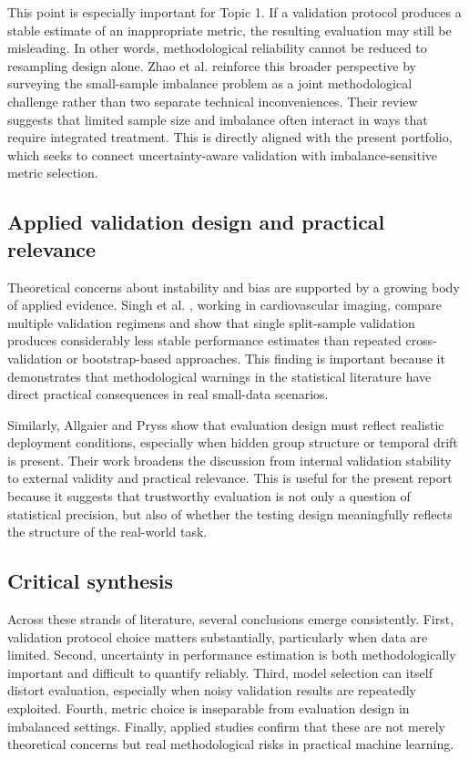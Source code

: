 \documentclass[11pt,a4paper]{article}
\begin{document}
This point is especially important for Topic 1. If a validation protocol produces a stable estimate of an inappropriate metric, the resulting evaluation may still be misleading. In other words, methodological reliability cannot be reduced to resampling design alone. Zhao et al. \cite{zhao2025smallsampleimbalance} reinforce this broader perspective by surveying the small-sample imbalance problem as a joint methodological challenge rather than two separate technical inconveniences. Their review suggests that limited sample size and imbalance often interact in ways that require integrated treatment. This is directly aligned with the present portfolio, which seeks to connect uncertainty-aware validation with imbalance-sensitive metric selection.

\subsection{Applied validation design and practical relevance}

Theoretical concerns about instability and bias are supported by a growing body of applied evidence. Singh et al. \cite{singh2021impact}, working in cardiovascular imaging, compare multiple validation regimens and show that single split-sample validation produces considerably less stable performance estimates than repeated cross-validation or bootstrap-based approaches. This finding is important because it demonstrates that methodological warnings in the statistical literature have direct practical consequences in real small-data scenarios.

Similarly, Allgaier and Pryss \cite{allgaier2024practical} show that evaluation design must reflect realistic deployment conditions, especially when hidden group structure or temporal drift is present. Their work broadens the discussion from internal validation stability to external validity and practical relevance. This is useful for the present report because it suggests that trustworthy evaluation is not only a question of statistical precision, but also of whether the testing design meaningfully reflects the structure of the real-world task.

\subsection{Critical synthesis}

Across these strands of literature, several conclusions emerge consistently. First, validation protocol choice matters substantially, particularly when data are limited. Second, uncertainty in performance estimation is both methodologically important and difficult to quantify reliably. Third, model selection can itself distort evaluation, especially when noisy validation results are repeatedly exploited. Fourth, metric choice is inseparable from evaluation design in imbalanced settings. Finally, applied studies confirm that these are not merely theoretical concerns but real methodological risks in practical machine learning.
\end{document}
